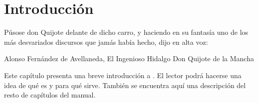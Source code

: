 %
%
%
%
%
%
%
%
%
%

\chapter{Introducción}

\begin{FraseCelebre}
\begin{Frase}
Púsose don Quijote delante de dicho carro, y haciendo en su fantasía
uno de los más desvariados discursos que jamás había hecho, dijo en
alta voz:
\end{Frase}
\begin{Fuente}
  Alonso Fernández de Avellaneda, El Ingenioso Hidalgo Don Quijote de
  la Mancha
\end{Fuente}
\end{FraseCelebre}

\begin{resumen}
  Este capítulo presenta una breve introducción a \texis.  El
  lector podrá hacerse una idea de qué es y para qué sirve. También se
  encuentra aquí una descripción del resto de capítulos del manual.
\end{resumen}



